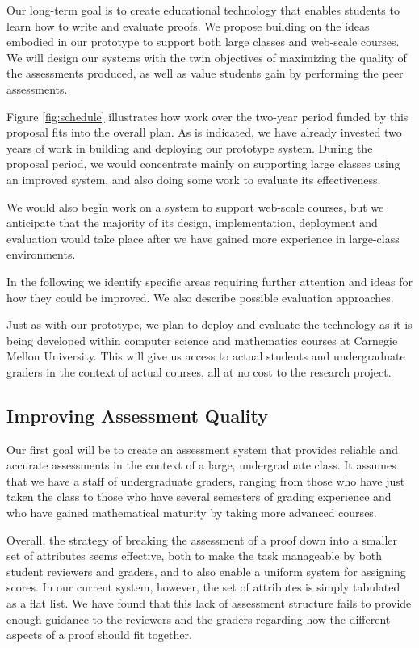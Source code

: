 \documentclass[12pt]{article}
\begin{document}
Our long-term goal is to create educational technology that enables
students to learn how to write and evaluate proofs.  We propose
building on the ideas embodied in our prototype to support both large
classes and web-scale courses.  We will design our systems with the
twin objectives of maximizing the quality of the assessments produced, as
well as value students gain by performing the peer assessments.

Figure \ref{fig:schedule} illustrates how work over the two-year
period funded by this proposal fits into the overall plan.  As is
indicated, we have already invested two years of work in building and
deploying our prototype system.  During the proposal period, we would
concentrate mainly on supporting large classes using an improved
system, and also doing some work to evaluate its effectiveness.

We would also begin work on a system to support web-scale courses, but
we anticipate that the majority of its design, implementation,
deployment and evaluation would take place after we have gained more
experience in large-class environments.

In the following we identify specific areas requiring further
attention and ideas for how they could be improved.  We also describe
possible evaluation approaches.

Just as with our prototype, we plan to deploy and evaluate
the technology as it is being developed within computer science and
mathematics courses at Carnegie Mellon University.  This will give us
access to actual students and undergraduate graders in the context of
actual courses, all at no cost to the research project.

\subsection{Improving Assessment Quality}

Our first goal will be to create an assessment system that provides
reliable and accurate assessments in the context of a large,
undergraduate class.  It assumes that we have a staff of undergraduate
graders, ranging from those who have just taken the class to those who
have several semesters of grading experience and who have gained
mathematical maturity by taking more advanced courses.

Overall, the strategy of breaking the assessment of a proof down into a smaller
set of attributes seems effective, both to make the task manageable by
both student reviewers and graders, and to also enable a uniform
system for assigning scores.  In our current system, however, the set
of attributes is simply tabulated as a flat list.  We have found that
this lack of assessment structure fails to provide enough guidance to the
reviewers and the graders regarding how the different aspects of a
proof should fit together.
\end{document}
